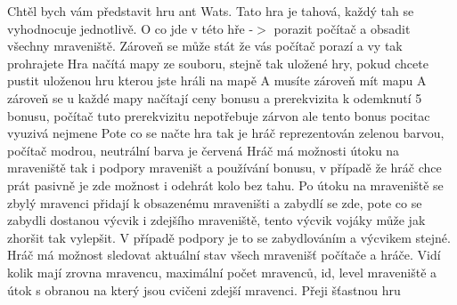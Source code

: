Chtěl bych vám představit hru ant Wats. Tato hra je tahová, každý tah se vyhodnocuje jednotlivě. O co jde v této hře -\/$>$ porazit počítač a obsadit všechny mraveniště. Zároveň se může stát že vás počítač porazí a vy tak prohrajete Hra načítá mapy ze souboru, stejně tak uložené hry, pokud chcete pustit uloženou hru kterou jste hráli na mapě A musíte zároveň mít mapu A zároveň se u každé mapy načítají ceny bonusu a prerekvizita k odemknutí 5 bonusu, počítač tuto prerekvizitu nepotřebuje zárvon ale tento bonus pocitac vyuzivá nejmene Pote co se načte hra tak je hráč reprezentován zelenou barvou, počítač modrou, neutrální barva je červená Hráč má možnosti útoku na mraveniště tak i podpory mraveništ a používání bonusu, v případě že hráč chce prát pasivně je zde možnost i odehrát kolo bez tahu. Po útoku na mraveniště se zbylý mravenci přidají k obsazenému mraveništi a zabydlí se zde, pote co se zabydli dostanou výcvik i zdejšího mraveniště, tento výcvik vojáky může jak zhoršit tak vylepšit. V případě podpory je to se zabydlováním a výcvikem stejné. Hráč má možnost sledovat aktuální stav všech mravenišť počítače a hráče. Vidí kolik mají zrovna mravencu, maximální počet mravenců, id, level mraveniště a útok s obranou na který jsou cvičeni zdejší mravenci. Přeji šťastnou hru 